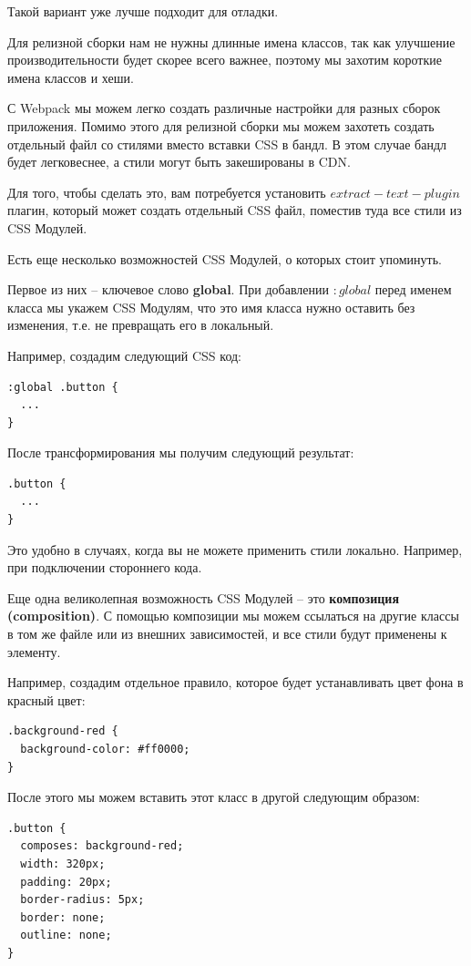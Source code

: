 Такой вариант уже лучше подходит для отладки.

Для релизной сборки нам не нужны длинные имена классов, так как улучшение производительности будет скорее всего важнее, поэтому мы захотим короткие имена классов и хеши.

С Webpack мы можем легко создать различные настройки для разных сборок приложения. Помимо этого для релизной сборки мы можем захотеть создать отдельный файл со стилями вместо вставки CSS в бандл. В этом случае бандл будет легковеснее, а стили могут быть закешированы в CDN.

Для того, чтобы сделать это, вам потребуется установить $extract-text-plugin$ плагин, который может создать отдельный CSS файл, поместив туда все стили из CSS Модулей.

Есть еще несколько возможностей CSS Модулей, о которых стоит упоминуть.

Первое из них -- ключевое слово \textbf{global}. При добавлении $:global$ перед именем класса мы укажем CSS Модулям, что это имя класса нужно оставить без изменения, т.е. не превращать его в локальный.

Например, создадим следующий CSS код:

\begin{lstlisting}
:global .button {
  ...
}
\end{lstlisting}

После трансформирования мы получим следующий результат:

\begin{lstlisting}
.button {
  ...
}
\end{lstlisting}

Это удобно в случаях, когда вы не можете применить стили локально. Например, при подключении стороннего кода.

Еще одна великолепная возможность CSS Модулей -- это \textbf{композиция (composition)}. С помощью композиции мы можем ссылаться на другие классы в том же файле или из внешних зависимостей, и все стили будут применены к элементу.

Например, создадим отдельное правило, которое будет устанавливать цвет фона в красный цвет:

\begin{lstlisting}
.background-red {
  background-color: #ff0000;
}
\end{lstlisting}

После этого мы можем вставить этот класс в другой следующим образом:

\begin{lstlisting}
.button {
  composes: background-red;
  width: 320px;
  padding: 20px;
  border-radius: 5px;
  border: none;
  outline: none;
}
\end{lstlisting}

